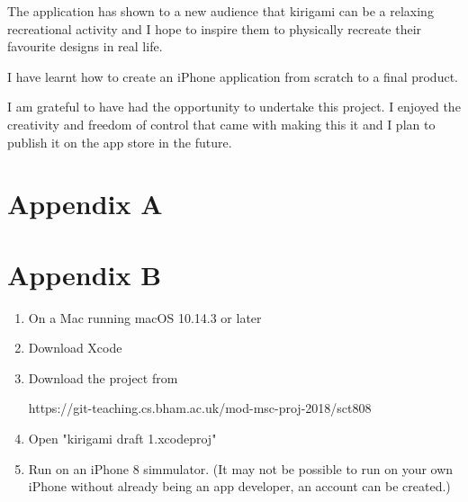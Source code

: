 \documentclass[11pt]{article}
\begin{document}
            The application has shown to a new audience that kirigami can be a relaxing recreational activity and I hope to inspire them to physically recreate their favourite designs in real life. 

            I have learnt how to create an iPhone application from scratch to a final product.
            
            I am grateful to have had the opportunity to undertake this project. I enjoyed the creativity and freedom of control that came with making this it and I plan to publish it on the app store in the future.
            

        
\newpage
\let\Section\section 
\def\section*#1{\Section{#1}}  

    
    
    \newpage
\Section{Appendix A}

\newpage
\Section{Appendix B}

        \begin{enumerate}
            \item On a Mac running macOS 10.14.3 or later
            \item Download Xcode
            \item Download the project from 
            
            https://git-teaching.cs.bham.ac.uk/mod-msc-proj-2018/sct808
            \item Open "kirigami draft 1.xcodeproj"
            \item Run on an iPhone 8 simmulator. 
            (It may not be possible to run on your own iPhone without already being an app developer, an account can be created.)
      
        \end{enumerate}
        
\end{document}
